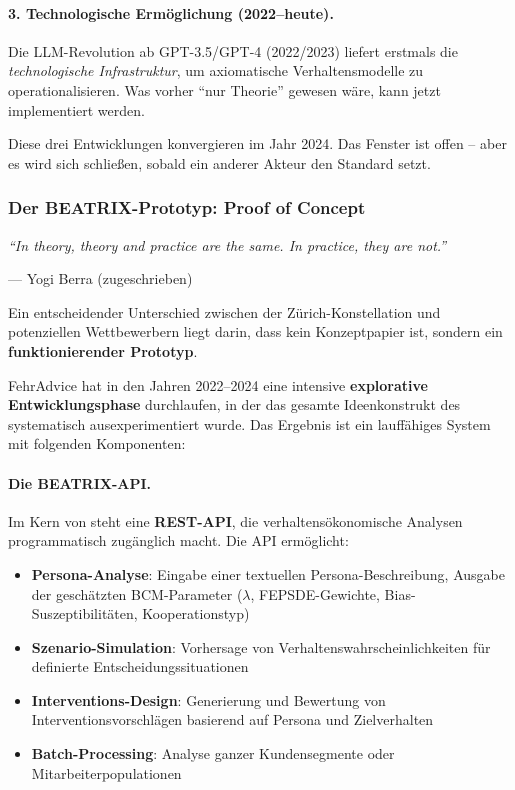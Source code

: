 \paragraph{3. Technologische Ermöglichung (2022--heute).}

Die LLM-Revolution ab GPT-3.5/GPT-4 (2022/2023) liefert erstmals die \textit{technologische Infrastruktur}, um axiomatische Verhaltensmodelle zu operationalisieren. Was vorher ``nur Theorie'' gewesen wäre, kann jetzt implementiert werden.

Diese drei Entwicklungen konvergieren im Jahr 2024. Das Fenster ist offen -- aber es wird sich schließen, sobald ein anderer Akteur den Standard setzt.

\subsubsection{Der BEATRIX-Prototyp: Proof of Concept}

\epigraph{\textit{``In theory, theory and practice are the same. In practice, they are not.''}}{--- Yogi Berra (zugeschrieben)}

Ein entscheidender Unterschied zwischen der Zürich-Konstellation und potenziellen Wettbewerbern liegt darin, dass \BEATRIX{} kein Konzeptpapier ist, sondern ein \textbf{funktionierender Prototyp}.

FehrAdvice hat in den Jahren 2022--2024 eine intensive \textbf{explorative Entwicklungsphase} durchlaufen, in der das gesamte Ideenkonstrukt des \BCM{} systematisch ausexperimentiert wurde. Das Ergebnis ist ein lauffähiges System mit folgenden Komponenten:

\paragraph{Die BEATRIX-API.}

Im Kern von \BEATRIX{} steht eine \textbf{REST-API}, die verhaltensökonomische Analysen programmatisch zugänglich macht. Die API ermöglicht:

\begin{itemize}
    \item \textbf{Persona-Analyse}: Eingabe einer textuellen Persona-Beschreibung, Ausgabe der geschätzten BCM-Parameter ($\lambda$, FEPSDE-Gewichte, Bias-Suszeptibilitäten, Kooperationstyp)

    \item \textbf{Szenario-Simulation}: Vorhersage von Verhaltenswahrscheinlichkeiten für definierte Entscheidungssituationen

    \item \textbf{Interventions-Design}: Generierung und Bewertung von Interventionsvorschlägen basierend auf Persona und Zielverhalten

    \item \textbf{Batch-Processing}: Analyse ganzer Kundensegmente oder Mitarbeiterpopulationen
\end{itemize}

